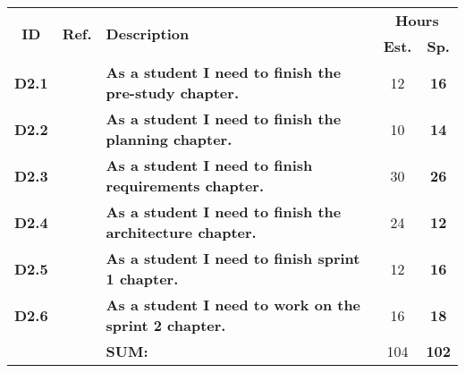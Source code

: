 \label{tab:sprint2Documentationstories}
\def\arraystretch{1.25}
 
\begin{longtable}{ccXcc}

\toprule[0.5mm]
\multirow{2}{*}{\textbf{ID}} &
\multirow{2}{*}{\textbf{Ref.}} & \multirow{2}{*}{\textbf{Description}} & \multicolumn{2}{c}{\textbf{Hours}} \\
 					& & & \textbf{Est.} & \textbf{Sp.} \\
\midrule


\textbf{D2.1} 	& 	& {\bf As a student I need to finish the pre-study chapter.} 									& 	12	& \textbf{ 16} \\

\textbf{D2.2} 	& 	& {\bf As a student I need to finish the planning chapter.} 									& 	10	& \textbf{ 14} \\

\textbf{D2.3} 	& 	& {\bf As a student I need to finish requirements chapter.} 									& 	30	& \textbf{ 26} \\

\textbf{D2.4} 	&   & {\bf As a student I need to finish the architecture chapter.} 								& 	24	& \textbf{ 12} \\

\textbf{D2.5} 	& 	& {\bf As a student I need to finish sprint 1 chapter.} 										& 	12	& \textbf{ 16} \\

\textbf{D2.6} 	& 	& {\bf As a student I need to work on the  sprint 2 chapter.} 									& 	16	& \textbf{ 18} \\

								
\hline
				&& \textbf{SUM:}		&		104	& \textbf{102}
 \\																			
\bottomrule[0.5mm]
\end{longtable}
